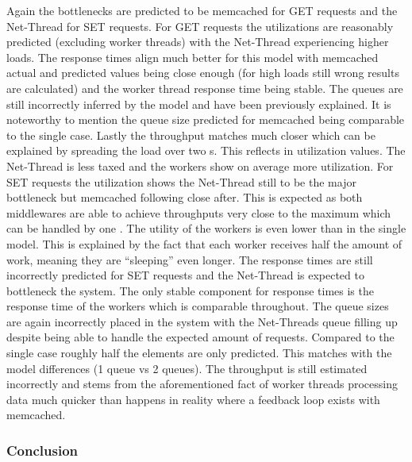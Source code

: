                 Again the bottlenecks are predicted to be memcached for GET requests and the Net-Thread for SET
                requests. For GET requests the utilizations are reasonably predicted (excluding worker threads) with the
                Net-Thread experiencing higher loads. The response times align much better for this model with memcached
                actual and predicted values being close enough (for high loads still wrong results are calculated) and
                the worker thread response time being stable. The queues are still incorrectly inferred by the model and
                have been previously explained. It is noteworthy to mention the queue size predicted for memcached being
                comparable to the single \mw{} case. Lastly the throughput matches much closer which can be explained by
                spreading the load over two \mw{}s. This reflects in utilization values. The Net-Thread is less taxed
                and the workers show on average more utilization.\newline
                For SET requests the utilization shows the Net-Thread still to be the major bottleneck but memcached
                following close after. This is expected as both middlewares are able to achieve throughputs very close
                to the maximum which can be handled by one \srv{}. The utility of the workers is even lower than in the
                single \mw{} model. This is explained by the fact that each worker receives half the amount of work,
                meaning they are ``sleeping'' even longer. The response times are still incorrectly predicted for SET
                requests and the Net-Thread is expected to bottleneck the system. The only stable component for response
                times is the response time of the workers which is comparable throughout. The queue sizes are again
                incorrectly placed in the system with the Net-Threads queue filling up despite being able to handle the
                expected amount of requests. Compared to the single \mw{} case roughly half the elements are only
                predicted. This matches with the model differences (1 queue vs 2 queues). The throughput is still
                estimated incorrectly and stems from the aforementioned fact of worker threads processing data much
                quicker than happens in reality where a feedback loop exists with memcached.

                \subsubsection{Conclusion\label{subsubsec:7_noq_conclusion}}

